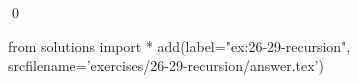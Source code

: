 
\begin{ex}
  \label{ex:26-29-recursion}
  
  \qed
\end{ex}
\begin{python0}
from solutions import *
add(label="ex:26-29-recursion",
    srcfilename='exercises/26-29-recursion/answer.tex')
\end{python0}
